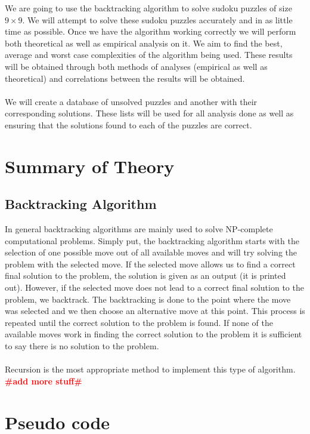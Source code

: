 \documentclass[12pt,a4paper,titlepage]{article}
\newcommand{\todo}[1]{\textcolor{red}{\textbf{\##1\#}}}
\begin{document}
We are going to use the backtracking algorithm to solve sudoku puzzles of size $9\times 9$. We will attempt to solve these sudoku puzzles accurately and in as little time as possible. Once we have the algorithm working correctly we will perform both theoretical as well as empirical analysis on it. We aim to find the best, average and worst case complexities of the algorithm being used. These results will be obtained through both methods of analyses (empirical as well as theoretical) and correlations between the results will be obtained.
\\
\\
We will create a database of unsolved puzzles and another with their corresponding solutions. These lists will be used for all analysis done as well as ensuring that the solutions found to each of the puzzles are correct. 
\\

\section{Summary of Theory}

\subsection{Backtracking Algorithm}

In general backtracking algorithms are mainly used to solve NP-complete computational problems. Simply put, the backtracking algorithm starts with the selection of one possible move out of all available moves and will try solving the problem with the selected move. If the selected move allows us to find a correct final solution to the problem, the solution is given as an output (it is printed out). However, if the selected move does not lead to a correct final solution to the problem, we backtrack. The backtracking is done to the point where the move was selected and we then choose an alternative move at this point. This process is repeated until the correct solution to the problem is found. If none of the available moves work in finding the correct solution to the problem it is sufficient to say there is no solution to the problem.
\\
\\
Recursion is the most appropriate method to implement this type of algorithm.
\\
\todo{add more stuff}

\section{Pseudo code}
\end{document}

